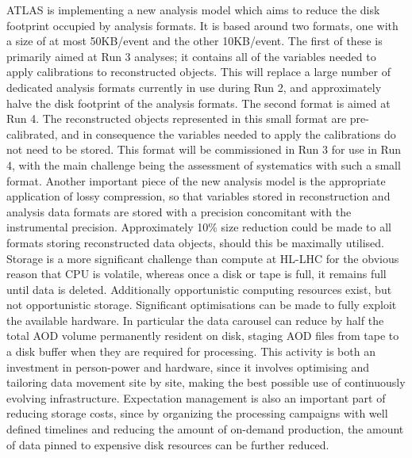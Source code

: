 ATLAS is implementing a new analysis model which aims to reduce the disk footprint occupied by analysis formats. It is based around two formats, one with a size of at most 50KB/event and the other 10KB/event. The first of these is primarily aimed at Run 3 analyses; it contains all of the variables needed to apply calibrations to reconstructed objects. This will replace a large number of dedicated analysis formats currently in use during Run 2, and approximately halve the disk footprint of the analysis formats. The second format is aimed at Run 4. The reconstructed objects represented in this small format are pre-calibrated, and in consequence the variables needed to apply the calibrations do not need to be stored. This format will be commissioned in Run 3 for use in Run 4, with the main challenge being the assessment of systematics with such a small format. Another important piece of the new analysis model is the appropriate application of lossy compression, so that variables stored in reconstruction and analysis data formats are stored with a precision concomitant with the instrumental precision. Approximately 10\% size reduction could be made to all formats storing reconstructed data objects, should this be maximally utilised. \\

Storage is a more significant challenge than compute at HL-LHC for the obvious reason that CPU is volatile, whereas once a disk or tape is full, it remains full until data is deleted. Additionally opportunistic computing resources exist, but not opportunistic storage. Significant optimisations can be made to fully exploit the available hardware. In particular the data carousel can reduce by half the total AOD volume permanently resident on disk, staging AOD files from tape to a disk buffer when they are required for processing. This activity is both an investment in person-power and hardware, since it involves optimising and tailoring data movement site by site, making the best possible use of continuously evolving infrastructure. Expectation management is also an important part of reducing storage costs, since by organizing the processing campaigns with well defined timelines and reducing the amount of on-demand production, the amount of data pinned to expensive disk resources can be further reduced. \\

